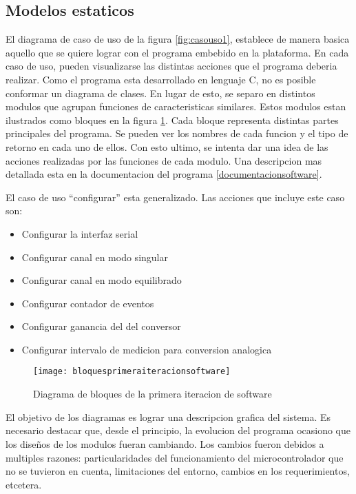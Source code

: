 \subsection{Modelos estaticos} %
\label{it2:sub:modelos_estaticos}

El diagrama de caso de uso de la figura \ref{fig:casouso1}, establece de manera basica aquello que se quiere lograr con el programa embebido en la plataforma. En cada caso de uso, pueden visualizarse las distintas acciones que el programa deberia realizar. Como el programa esta desarrollado en lenguaje C, no es posible conformar un diagrama de clases. En lugar de esto, se separo en distintos modulos que agrupan funciones de caracteristicas similares. Estos modulos estan ilustrados como bloques en la figura \ref{it2:fig:bloquesprimeraiteracionsoftware}. Cada bloque representa distintas partes principales del programa. Se pueden ver los nombres de cada funcion y el tipo de retorno en cada uno de ellos. Con esto ultimo, se intenta dar una idea de las acciones realizadas por las funciones de cada modulo. Una descripcion mas detallada esta en la documentacion del programa \ref{documentacionsoftware}.

El caso de uso ``configurar'' esta generalizado. Las acciones que incluye este caso son:
\begin{itemize}
  \item Configurar la interfaz serial
  \item Configurar canal en modo singular
  \item Configurar canal en modo equilibrado
  \item Configurar contador de eventos
  \item Configurar ganancia del del conversor
  \item Configurar intervalo de medicion para conversion analogica
\end{itemize}


\begin{figure}[h]
  \centering
  \texttt{[image: bloquesprimeraiteracionsoftware]}
  \caption{Diagrama de bloques de la primera iteracion de software}\label{it2:fig:bloquesprimeraiteracionsoftware}
\end{figure}

El objetivo de los diagramas es lograr una descripcion grafica del sistema. Es necesario destacar que, desde el principio, la evolucion del programa ocasiono que los diseños de los modulos fueran cambiando. Los cambios fueron debidos a multiples razones: particularidades del funcionamiento del microcontrolador que no se tuvieron en cuenta, limitaciones del entorno, cambios en los requerimientos, etcetera. 

